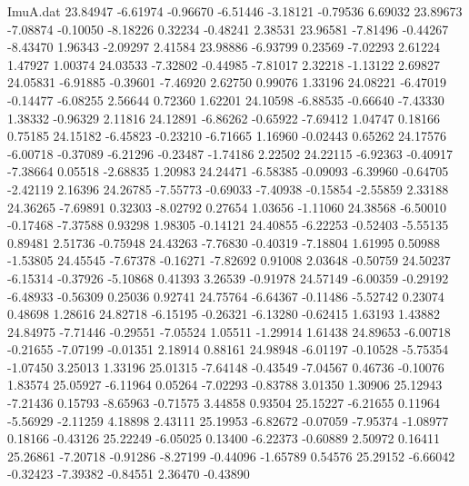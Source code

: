 \begin{filecontents}{ImuA.dat}
  23.84947   -6.61974   -0.96670   -6.51446   -3.18121   -0.79536    6.69032
  23.89673   -7.08874   -0.10050   -8.18226    0.32234   -0.48241    2.38531
  23.96581   -7.81496   -0.44267   -8.43470    1.96343   -2.09297    2.41584
  23.98886   -6.93799    0.23569   -7.02293    2.61224    1.47927    1.00374
  24.03533   -7.32802   -0.44985   -7.81017    2.32218   -1.13122    2.69827
  24.05831   -6.91885   -0.39601   -7.46920    2.62750    0.99076    1.33196
  24.08221   -6.47019   -0.14477   -6.08255    2.56644    0.72360    1.62201
  24.10598   -6.88535   -0.66640   -7.43330    1.38332   -0.96329    2.11816
  24.12891   -6.86262   -0.65922   -7.69412    1.04747    0.18166    0.75185
  24.15182   -6.45823   -0.23210   -6.71665    1.16960   -0.02443    0.65262
  24.17576   -6.00718   -0.37089   -6.21296   -0.23487   -1.74186    2.22502
  24.22115   -6.92363   -0.40917   -7.38664    0.05518   -2.68835    1.20983
  24.24471   -6.58385   -0.09093   -6.39960   -0.64705   -2.42119    2.16396
  24.26785   -7.55773   -0.69033   -7.40938   -0.15854   -2.55859    2.33188
  24.36265   -7.69891    0.32303   -8.02792    0.27654    1.03656   -1.11060
  24.38568   -6.50010   -0.17468   -7.37588    0.93298    1.98305   -0.14121
  24.40855   -6.22253   -0.52403   -5.55135    0.89481    2.51736   -0.75948
  24.43263   -7.76830   -0.40319   -7.18804    1.61995    0.50988   -1.53805
  24.45545   -7.67378   -0.16271   -7.82692    0.91008    2.03648   -0.50759
  24.50237   -6.15314   -0.37926   -5.10868    0.41393    3.26539   -0.91978
  24.57149   -6.00359   -0.29192   -6.48933   -0.56309    0.25036    0.92741
  24.75764   -6.64367   -0.11486   -5.52742    0.23074    0.48698    1.28616
  24.82718   -6.15195   -0.26321   -6.13280   -0.62415    1.63193    1.43882
  24.84975   -7.71446   -0.29551   -7.05524    1.05511   -1.29914    1.61438
  24.89653   -6.00718   -0.21655   -7.07199   -0.01351    2.18914    0.88161
  24.98948   -6.01197   -0.10528   -5.75354   -1.07450    3.25013    1.33196
  25.01315   -7.64148   -0.43549   -7.04567    0.46736   -0.10076    1.83574
  25.05927   -6.11964    0.05264   -7.02293   -0.83788    3.01350    1.30906
  25.12943   -7.21436    0.15793   -8.65963   -0.71575    3.44858    0.93504
  25.15227   -6.21655    0.11964   -5.56929   -2.11259    4.18898    2.43111
  25.19953   -6.82672   -0.07059   -7.95374   -1.08977    0.18166   -0.43126
  25.22249   -6.05025    0.13400   -6.22373   -0.60889    2.50972    0.16411
  25.26861   -7.20718   -0.91286   -8.27199   -0.44096   -1.65789    0.54576
  25.29152   -6.66042   -0.32423   -7.39382   -0.84551    2.36470   -0.43890

\end{filecontents}
